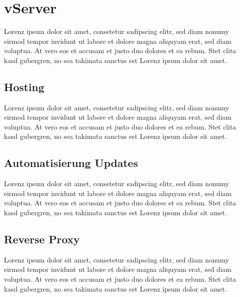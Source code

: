 \section{vServer}\label{subsec:vserver}

Lorenz ipsum dolor sit amet, consetetur sadipscing elitr, sed diam nonumy eirmod tempor invidunt ut labore et dolore magna aliquyam erat, sed diam voluptua.
At vero eos et accusam et justo duo dolores et ea rebum.
Stet clita kasd gubergren, no sea takimata sanctus est Lorenz ipsum dolor sit amet.

\subsection{Hosting}\label{subsubsec:hosting}

Lorenz ipsum dolor sit amet, consetetur sadipscing elitr, sed diam nonumy eirmod tempor invidunt ut labore et dolore magna aliquyam erat, sed diam voluptua.
At vero eos et accusam et justo duo dolores et ea rebum.
Stet clita kasd gubergren, no sea takimata sanctus est Lorenz ipsum dolor sit amet.

\subsection{Automatisierung Updates}\label{subsubsec:automatisierung-updates}

Lorenz ipsum dolor sit amet, consetetur sadipscing elitr, sed diam nonumy eirmod tempor invidunt ut labore et dolore magna aliquyam erat, sed diam voluptua.
At vero eos et accusam et justo duo dolores et ea rebum.
Stet clita kasd gubergren, no sea takimata sanctus est Lorenz ipsum dolor sit amet.

\subsection{Reverse Proxy}\label{subsubsec:reverse-proxy}

Lorenz ipsum dolor sit amet, consetetur sadipscing elitr, sed diam nonumy eirmod tempor invidunt ut labore et dolore magna aliquyam erat, sed diam voluptua.
At vero eos et accusam et justo duo dolores et ea rebum.
Stet clita kasd gubergren, no sea takimata sanctus est Lorenz ipsum dolor sit amet.

